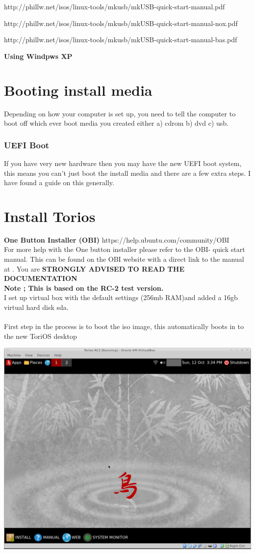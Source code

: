 \documentclass[12pt,a4paper]{book}
\begin{document}
http://phillw.net/isos/linux-tools/mkusb/mkUSB-quick-start-manual.pdf

http://phillw.net/isos/linux-tools/mkusb/mkUSB-quick-start-manual-nox.pdf

http://phillw.net/isos/linux-tools/mkusb/mkUSB-quick-start-manual-bas.pdf

\textbf{Using Windpws XP}

\newpage 

\chapter{Booting install media}

Depending on how your computer is set up,  you need to tell the computer to boot off which ever boot media you created either a) cdrom b) dvd c) usb. \\

\subsection{UEFI Boot}
If you have very new hardware then you may have the new UEFI boot system,  this means you can't just boot the install media and there are a few extra steps. I have found a guide \cite{UEFILinux} on this generally. 
\newpage

\chapter{Install Torios}
\textbf{One Button Installer (OBI) }
https://help.ubuntu.com/community/OBI\\
For more help with the One button installer please refer to the OBI- quick start manual. This can be found on the OBI website \cite{OBI} with a direct link to the manual at \cite{OBI Quickstart}. You are \textbf{STRONGLY ADVISED TO READ THE DOCUMENTATION}
\\
\textbf{Note ; This is based on the RC-2 test version.}
\linebreak \\
I set up virtual box with the default settings (256mb RAM)and added a 16gb virtual hard disk sda. \\
\\
First step in the process is to boot the iso image,  this automatically boots in to the new ToriOS desktop

\includegraphics[width=0.7\linewidth]{screen-shots/toriosRC2} 
\end{document}
